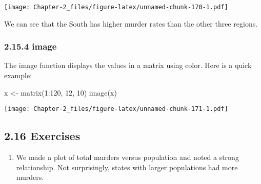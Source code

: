 \documentclass[
]{article}
\newenvironment{Shaded}{\begin{snugshade}}{\end{snugshade}}
\newcommand{\DecValTok}[1]{\textcolor[rgb]{0.00,0.00,0.81}{#1}}
\newcommand{\FunctionTok}[1]{\textcolor[rgb]{0.00,0.00,0.00}{#1}}
\newcommand{\NormalTok}[1]{#1}
\newcommand{\OtherTok}[1]{\textcolor[rgb]{0.56,0.35,0.01}{#1}}
\newcommand{\SpecialCharTok}[1]{\textcolor[rgb]{0.00,0.00,0.00}{#1}}
\providecommand{\tightlist}{%
  \setlength{\itemsep}{0pt}\setlength{\parskip}{0pt}}
\begin{document}
\texttt{[image: Chapter-2\_files/figure-latex/unnamed-chunk-170-1.pdf]}

We can see that the South has higher murder rates than the other three
regions.

\hypertarget{image}{%
\subsubsection{2.15.4 image}\label{image}}

The image function displays the values in a matrix using color. Here is
a quick example:

\begin{Shaded}
\begin{Highlighting}[]
\NormalTok{x }\OtherTok{\textless{}{-}} \FunctionTok{matrix}\NormalTok{(}\DecValTok{1}\SpecialCharTok{:}\DecValTok{120}\NormalTok{, }\DecValTok{12}\NormalTok{, }\DecValTok{10}\NormalTok{)}
\FunctionTok{image}\NormalTok{(x)}
\end{Highlighting}
\end{Shaded}

\texttt{[image: Chapter-2\_files/figure-latex/unnamed-chunk-171-1.pdf]}

\hypertarget{exercises-6}{%
\subsection{2.16 Exercises}\label{exercises-6}}

\begin{enumerate}
\def\labelenumi{\arabic{enumi}.}
\tightlist
\item
  We made a plot of total murders versus population and noted a strong
  relationship. Not surprisingly, states with larger populations had
  more murders.
\end{enumerate}

\begin{Shaded}
\end{Shaded}
\end{document}
